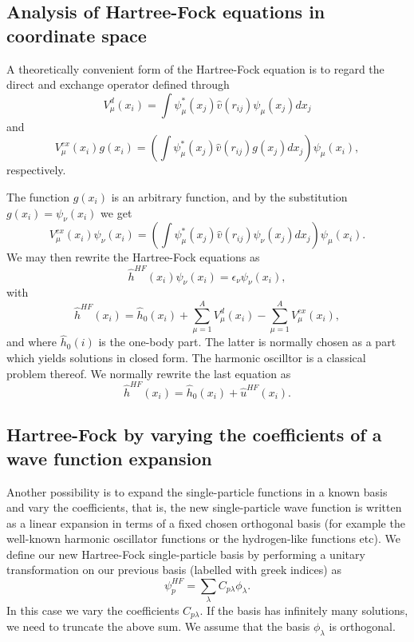 \documentclass[%
oneside,                 %
final,                   %
10pt]{article}
\begin{document}
\subsection*{Analysis of Hartree-Fock equations in coordinate space}

  A theoretically convenient form of the
Hartree-Fock equation is to regard the direct and exchange operator
defined through 
\begin{equation*}
  V_{\mu}^{d}(x_i) = \int \psi_{\mu}^*(x_j) 
 \hat{v}(r_{ij})\psi_{\mu}(x_j) dx_j
\end{equation*}
and
\begin{equation*}
  V_{\mu}^{ex}(x_i) g(x_i) 
  = \left(\int \psi_{\mu}^*(x_j) 
 \hat{v}(r_{ij})g(x_j) dx_j
  \right)\psi_{\mu}(x_i),
\end{equation*}
respectively. 

The function $g(x_i)$ is an arbitrary function,
and by the substitution $g(x_i) = \psi_{\nu}(x_i)$
we get
\begin{equation*}
  V_{\mu}^{ex}(x_i) \psi_{\nu}(x_i) 
  = \left(\int \psi_{\mu}^*(x_j) 
 \hat{v}(r_{ij})\psi_{\nu}(x_j)
  dx_j\right)\psi_{\mu}(x_i).
\end{equation*}
We may then rewrite the Hartree-Fock equations as
\[
  \hat{h}^{HF}(x_i) \psi_{\nu}(x_i) = \epsilon_{\nu}\psi_{\nu}(x_i),
\]
with
\[
  \hat{h}^{HF}(x_i)= \hat{h}_0(x_i) + \sum_{\mu=1}^AV_{\mu}^{d}(x_i) -
  \sum_{\mu=1}^AV_{\mu}^{ex}(x_i),
\]
and where $\hat{h}_0(i)$ is the one-body part. The latter is normally chosen as a part which yields solutions in closed form. The harmonic oscilltor is a classical problem thereof.
We normally rewrite the last equation as
\[
  \hat{h}^{HF}(x_i)= \hat{h}_0(x_i) + \hat{u}^{HF}(x_i). 
\]

\subsection*{Hartree-Fock by varying the coefficients of a wave function expansion}

Another possibility is to expand the single-particle functions in a known basis  and vary the coefficients, 
that is, the new single-particle wave function is written as a linear expansion
in terms of a fixed chosen orthogonal basis (for example the well-known harmonic oscillator functions or the hydrogen-like functions etc).
We define our new Hartree-Fock single-particle basis by performing a unitary transformation 
on our previous basis (labelled with greek indices) as
\begin{equation}
\psi_p^{HF}  = \sum_{\lambda} C_{p\lambda}\phi_{\lambda}. \label{eq:newbasis}
\end{equation}
In this case we vary the coefficients $C_{p\lambda}$. If the basis has infinitely many solutions, we need
to truncate the above sum.  We assume that the basis $\phi_{\lambda}$ is orthogonal.
\end{document}
